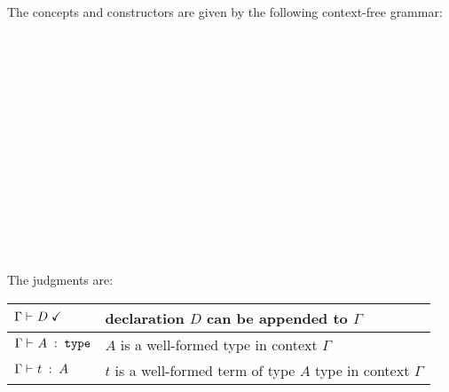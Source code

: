 The concepts and constructors are given by the following context-free grammar:

\begin{commgrammar}
\\
\\
\\
\\
\\
\\
\\
\\
\\
\\
\\
\\
\\
\end{commgrammar}

The judgments are:
\begin{center}
	\begin{tabular}{|l|l|}
	  \hline
		$\Gamma\vdash^{}_{}D\;\checkmark$        & declaration $D$ can be appended to $\Gamma$ \\\hline
		$\Gamma\vdash^{}_{}A\;:\;\mathtt{type}$ & $A$ is a well-formed type in context $\Gamma$ \\
		$\Gamma\vdash^{}_{}t\;:\;A$     & $t$ is a well-formed term of type $A$ type in context $\Gamma$ \\
		\hline
	\end{tabular}
\end{center}

